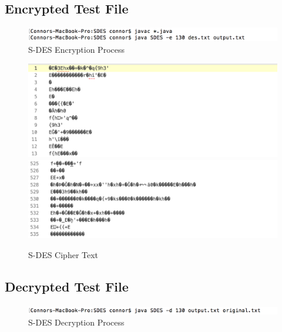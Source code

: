 \documentclass[]{article}
\begin{document}
\subsection*{Encrypted Test File}

\begin{figure}[H]
	\includegraphics[width=\textwidth]{sdes_encrypt.png}
	\caption{S-DES Encryption Process}
	\centering
\end{figure}

\begin{figure}[H]
	\includegraphics[height=\textheight/5,width=\textwidth]{sdes_cipher1.png}
	\includegraphics[height=\textheight/5,width=\textwidth]{sdes_cipher2.png}	
	\caption{S-DES Cipher Text}
	\centering
\end{figure}

\subsection*{Decrypted Test File}

\begin{figure}[H]
	\includegraphics[width=\textwidth]{sdes_decrypt.png}
	\caption{S-DES Decryption Process}
	\centering
\end{figure}
\end{document}
